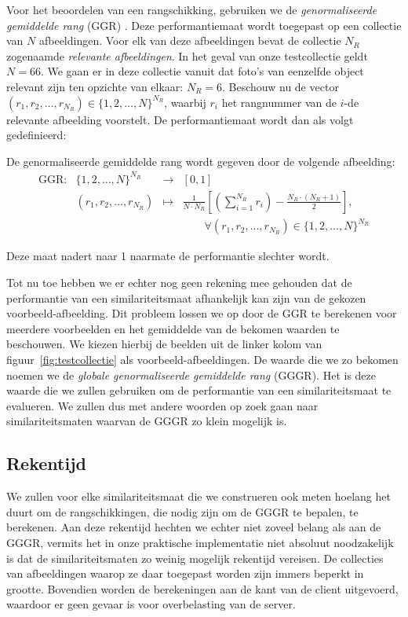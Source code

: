 Voor het beoordelen van een rangschikking, gebruiken we de \emph{genormaliseerde gemiddelde rang} 
(GGR) \cite{muller:perf_eval}. Deze performantiemaat wordt toegepast op een collectie
van $N$ afbeeldingen. Voor elk van deze afbeeldingen bevat de collectie
$N_R$ zogenaamde \emph{relevante afbeeldingen}. In het geval van onze testcollectie geldt $N = 66$.
We gaan er in deze collectie vanuit dat foto's van eenzelfde object relevant zijn ten opzichte
van elkaar: $N_R = 6$. Beschouw nu de vector 
$(r_1,r_2,\ldots,r_{N_R}) \in \{1,2,\ldots,N\}^{N_R}$, waarbij $r_i$ het
rangnummer van de $i$-de relevante afbeelding voorstelt. De performantiemaat
wordt dan als volgt gedefinieerd:
\begin{definitie}
De genormaliseerde gemiddelde rang wordt gegeven door de volgende afbeelding:
$$
\begin{array}{lrcl}
\textrm{GGR}: 	& \{1,2,\ldots,N\}^{N_R} & \to 	& [0,1] \\
		& (r_1,r_2,\ldots,r_{N_R}) & \mapsto &
	{\displaystyle\frac{1}{N \cdot N_R}\left[ \left(\sum_{i=1}^{N_R}r_i\right) - \frac{N_R \cdot (N_R + 1)}{2} \right]},\\
	& & & \qquad \forall (r_1, r_2, ..., r_{N_R}) \in \{1,2,\ldots,N\}^{N_R}
\end{array}
$$
\end{definitie}
\noindent
Deze maat nadert naar 1 naarmate de performantie slechter wordt.

Tot nu toe hebben we er echter nog geen rekening mee gehouden dat de performantie van
een similariteitsmaat afhankelijk kan zijn van de gekozen voorbeeld-afbeelding. Dit probleem lossen we
op door de GGR te berekenen voor meerdere voorbeelden en het gemiddelde van de bekomen waarden
te beschouwen. We kiezen hierbij de beelden uit de linker kolom van 
figuur~\ref{fig:testcollectie} als voorbeeld-afbeeldingen. De waarde die we zo bekomen noemen we de
\emph{globale genormaliseerde gemiddelde rang} (GGGR). Het is deze waarde die we zullen gebruiken
om de performantie van een similariteitsmaat te evalueren. We zullen dus met andere woorden op
zoek gaan naar similariteitsmaten waarvan de GGGR zo klein mogelijk is.

\subsection{Rekentijd}

We zullen voor elke similariteitsmaat die we construeren ook meten hoelang het duurt om
de rangschikkingen, die nodig zijn om de GGGR te bepalen, te berekenen. Aan deze 
rekentijd hechten we echter niet zoveel belang als aan de GGGR, vermits het in onze
praktische implementatie niet absoluut noodzakelijk is dat de similariteitsmaten zo weinig
mogelijk rekentijd vereisen. De collecties van afbeeldingen waarop ze daar toegepast worden
zijn immers beperkt in grootte. Bovendien worden de berekeningen aan de kant van de client
uitgevoerd, waardoor er geen gevaar is voor overbelasting van de server.


